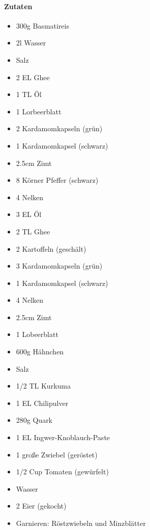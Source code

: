 \clearpage
{}

\paragraph{Zutaten}
\begin{itemize}[noitemsep]
	\item 300g Basmatireis
	\item 2l Wasser
	\item Salz 
	\item 2 EL Ghee
	\item 1 TL Öl
	\item 1 Lorbeerblatt
	\item 2 Kardamomkapseln (grün)
	\item 1 Kardamomkapsel (schwarz)
	\item 2.5cm Zimt
	\item 8 Körner Pfeffer (schwarz)
	\item 4 Nelken
	\vspace{0.5cm}
	\item 3 EL Öl
	\item 2 TL Ghee
	\item 2 Kartoffeln (geschält)
	\item 3 Kardamomkapseln (grün)
	\item 1 Kardamomkapsel (schwarz)
	\item 4 Nelken
	\item 2.5cm Zimt
	\item 1 Lobeerblatt
	\vspace{0.5cm}
	\item 600g Hähnchen
	\item Salz
	\item 1/2 TL Kurkuma
	\item 1 EL Chilipulver
	\item 280g Quark
	\item 1 EL Ingwer-Knoblauch-Paste
	\item 1 große Zwiebel (geröstet)
	\item 1/2 Cup Tomaten (gewürfelt)
	\item Wasser
	\item 2 Eier (gekocht)
	\item Garnieren: Röstzwiebeln und Minzblätter
\end{itemize}

